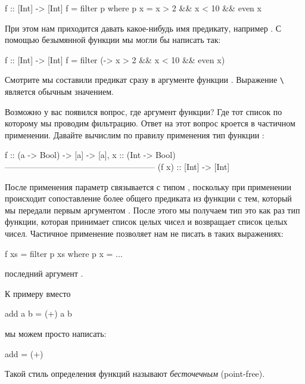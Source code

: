 \begin{code}
f :: [Int] -> [Int]
f = filter p
    where p x = x > 2 && x < 10 && even x
\end{code}

При этом нам приходится давать какое-нибудь имя предикату,
например . С помощью безымянной функции мы могли бы написать 
так:

\begin{code}
f :: [Int] -> [Int]
f = filter (\x -> x > 2 && x < 10 && even x)
\end{code}

Смотрите мы составили предикат сразу в аргументе 
функции . Выражение 
\In{(}\verb!\!
является обычным значением. 

Возможно у вас появился вопрос, где аргумент функции? Где тот 
список по которому мы проводим фильтрацию. Ответ на этот вопрос
кроется в частичном применении. Давайте вычислим по правилу 
применения тип функции :

\begin{code}
    f :: (a -> Bool) -> [a] -> [a],    x :: (Int -> Bool)
    ------------------------------------------------------
                (f x) :: [Int] -> [Int]
\end{code}

После применения параметр  связывается с типом ,
поскольку при применении происходит сопоставление более общего
предиката  из функции  с тем, который
мы передали первым аргументом . После этого
мы получаем тип  это как раз тип
функции, которая принимает список целых чисел и возвращает список 
целых чисел. Частичное применение позволяет нам не писать
в таких выражениях:

\begin{code}
f xs = filter p xs
    where p x = ...
\end{code}


\noindent последний аргумент . 

К примеру вместо

\begin{code}
add a b = (+) a b
\end{code}

\noindent мы можем просто написать:

\begin{code}
add = (+)
\end{code}

Такой стиль определения функций называют \emph{бесточечным} 
(point-free).

